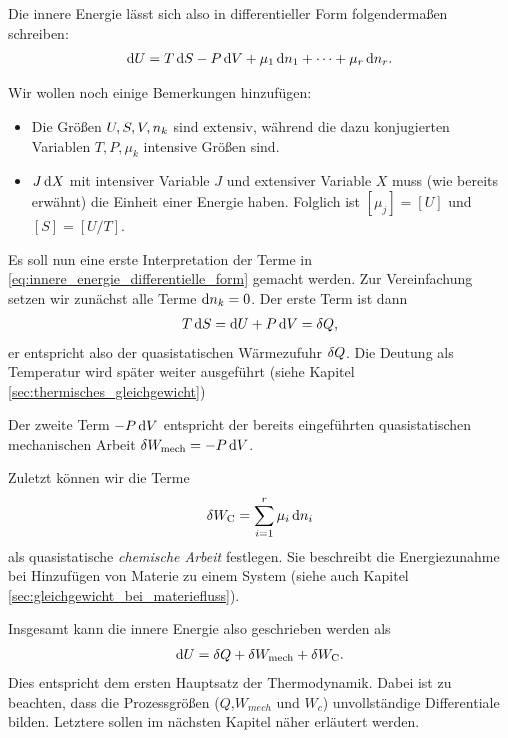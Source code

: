 Die innere Energie lässt sich also in differentieller Form folgendermaßen schreiben:
\begin{align}
    \label{eq:innere_energie_differentielle_form}
    \mathop{}\!\mathrm{d} U = T\mathop{}\!\mathrm{d} S - P \mathop{}\!\mathrm{d} V + \mu_1 \mathop{}\!\mathrm{d} n_1 + \cdots + \mu_r \mathop{}\!\mathrm{d} n_r.
\end{align}

Wir wollen noch einige Bemerkungen hinzufügen:
\begin{itemize}
    \item Die Größen $U, S,V,n_k$ sind extensiv, während die dazu konjugierten Variablen $T,P,\mu_k$ intensive Größen sind.
    \item $J\mathop{}\!\mathrm{d} X$ mit intensiver Variable $J$ und extensiver Variable $X$ muss (wie bereits erwähnt) die Einheit einer Energie haben. Folglich ist $[\mu_j] = [U]$ und $[S]=[U/T]$.
\end{itemize}

Es soll nun eine erste Interpretation der Terme in \eqref{eq:innere_energie_differentielle_form} gemacht werden.
Zur Vereinfachung setzen wir zunächst alle Terme $\mathop{}\!\mathrm{d} n_k=0$.
Der erste Term ist dann
\begin{align*}
    T\mathop{}\!\mathrm{d} S = \mathop{}\!\mathrm{d} U+ P\mathop{}\!\mathrm{d} V = \mathop{}\!\delta Q,
\end{align*}
er entspricht also der quasistatischen Wärmezufuhr $\mathop{}\!\delta Q$.
Die Deutung als Temperatur wird später weiter ausgeführt (siehe Kapitel \ref{sec:thermisches_gleichgewicht})

Der zweite Term $-P\mathop{}\!\mathrm{d} V$ entspricht der bereits eingeführten quasistatischen mechanischen Arbeit $\mathop{}\!\delta W_\mathrm{mech}=-P\mathop{}\!\mathrm{d} V$.

Zuletzt können wir die Terme
\begin{align*}
    \mathop{}\!\delta W_ \mathrm{C} = \sum_{i = 1}^r \mu_i\mathop{}\!\mathrm{d} n_i
\end{align*}
als quasistatische \emph{chemische Arbeit} festlegen. Sie beschreibt die Energiezunahme bei Hinzufügen von Materie zu einem System (siehe auch Kapitel \ref{sec:gleichgewicht_bei_materiefluss}).

Insgesamt kann die innere Energie also geschrieben werden als
\begin{align}
    \label{eq:erster_HS_TD}
    \mathop{}\!\mathrm{d} U = \mathop{}\!\delta Q + \mathop{}\!\delta W_\mathrm{mech} + \mathop{}\!\delta W_\mathrm{C}.
\end{align}
Dies entspricht dem ersten Hauptsatz der Thermodynamik.
Dabei ist zu beachten, dass die Prozessgrößen ($Q$,$W_{mech}$ und $W_c$) unvollständige Differentiale bilden. Letztere sollen im nächsten Kapitel näher erläutert werden.

